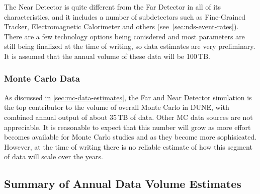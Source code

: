 The Near Detector is quite different from the Far Detector in all of its characteristics, and it includes a number of subdetectors
such as Fine-Grained Tracker, Electromagnetic Calorimeter and others (see~\ref{sec:nds-event-rates}). There are a few technology
options being conisdered and most parameters are still being finalized at the time of writing, so data estimates are very preliminary.
It is
assumed that the annual volume of these data will be 100\,TB.



\subsubsection{Monte Carlo Data}
As discussed in \ref{sec:mc-data-estimates}, the Far and Near Detector simulation is the top contributor to the volume of overall
Monte Carlo in DUNE, with combined annual output of about 35\,TB of data. Other MC data sources are not appreciable.
It is reasonable to expect that this number will grow as more effort becomes available for Monte Carlo studies and
as they become more sophisicated. However, at the time of writing there is no reliable estimate of how this segment of data
will scale over the years.


\subsection{Summary of Annual Data Volume Estimates}
